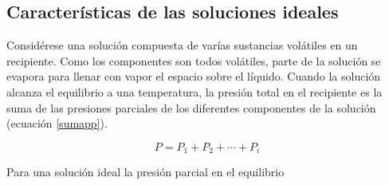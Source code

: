 \documentclass[11pt,letterpaper]{article}
\begin{document}
	\subsection{Características de las soluciones ideales}
	
	Considérese una solución compuesta de varías sustancias volátiles en un recipiente. Como los componentes son todos volátiles, parte de la solución se evapora para llenar con vapor el espacio sobre el líquido. Cuando la solución alcanza el equilibrio a una temperatura, la presión total en el recipiente es la suma de las presiones parciales de los diferentes componentes de la solución (ecuación \ref{sumapp}). \parencite{castellan}
	
	\begin{equation}
		P = P_1 + P_2 + \cdots + P_i \label{sumapp}
	\end{equation}
	
	Para una solución ideal la presión parcial en el equilibrio 
	
	\begin{Ley}[De Raoult]

	\end{Ley}

	
	
	
	\printbibliography[title={Referencias}]
	
\end{document}
